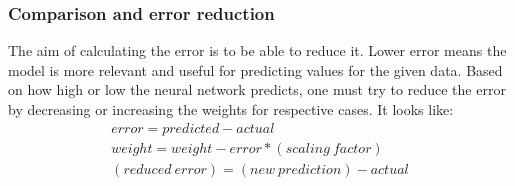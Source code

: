 \documentclass[conference,compsoc]{IEEEtran}
\begin{document}
\subsubsection{Comparison and error reduction}
The aim of calculating the error is to be able to reduce it. Lower error means the model is more relevant and useful for predicting values for the given data. Based on how high or low the neural network predicts, one must try to reduce the error by decreasing or increasing the weights for respective cases. It looks like:
\begin{gather*}
\label{reducederror}
    error = predicted-actual \\
    weight = weight - error*(scaling\ factor) \\
    (reduced\ error) = (new\ prediction) - actual
\end{gather*}
\end{document}

